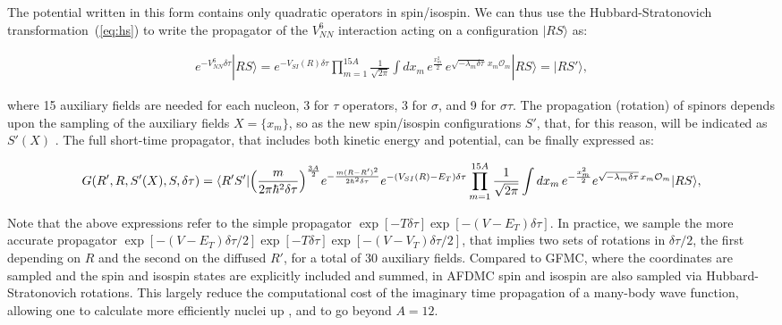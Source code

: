 \documentclass[aps,prc,twocolumn,superscriptaddress,floatfix]{revtex4-1}
\begin{document}
The potential written in this form contains only quadratic operators in spin/isospin. 
We can thus use the Hubbard-Stratonovich transformation~(\ref{eq:hs}) to write the
propagator of the $V_{NN}^6$ interaction acting on a configuration $|RS\rangle$ as:
\begin{widetext}
\begin{align}
e^{-V_{NN}^6\delta\tau}|RS\rangle=e^{-V_{SI}(R)\delta\tau}\prod_{m=1}^{15A}\frac{1}{\sqrt{2\pi}}
\displaystyle\int dx_m\,e^{\frac{x_m^2}{2}}\,e^{\sqrt{-\lambda_m\delta\tau}\,x_m \mathcal O_m}|RS\rangle
=|RS'\rangle ,
\end{align}
\end{widetext}
where 15 auxiliary fields are needed for each nucleon, 3 for $\tau$ operators, 3 for $\sigma$,
and 9 for $\sigma\tau$. The propagation (rotation) of spinors depends upon the sampling
of the auxiliary fields $X=\{x_m\}$, so as the new spin/isospin configurations $S'$, that, for this 
reason, will be indicated as $S'(X)$ .
The full short-time propagator, that includes both kinetic energy and potential, can be 
finally expressed as:
\begin{widetext}
\begin{align}
G(R',R,S'(X),S,\delta\tau)=\langle R'S'|\Big({m\over2\pi\hbar^2\delta\tau}\Big)^{3A\over2}e^{-{m(R-R')^2\over2\hbar^2\delta\tau}}
e^{-(V_{SI}(R)-E_T)\delta\tau}
\prod_{m=1}^{15A}{1\over\sqrt{2\pi}}\int dx_m\,e^{-{x_m^2\over2}}
e^{\sqrt{-\lambda_m\delta\tau}\,x_m \mathcal O_m}|RS\rangle,
\label{eq:prop}
\end{align}
\end{widetext}

Note that the above expressions refer to the simple propagator $\exp[-T\delta\tau]\exp[-(V-E_T)\delta\tau]$.
In practice, we sample the more accurate propagator 
$\exp[-(V-E_T)\delta\tau/2]\exp[-T\delta\tau]\exp[-(V-V_T)\delta\tau/2]$, that implies
two sets of rotations in $\delta\tau/2$, the first depending on $R$ and the second on 
the diffused $R'$, for a total of 30 auxiliary fields.
Compared to GFMC, where the coordinates are sampled and the spin and isospin states are 
explicitly included and summed, in AFDMC spin and isospin are also sampled via 
Hubbard-Stratonovich rotations. This largely reduce the computational cost of the
imaginary time propagation of a many-body wave function, allowing one to calculate 
more efficiently nuclei up , and to go beyond $A=12$.
\end{document}

